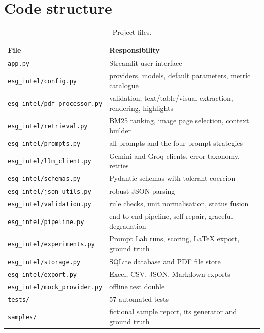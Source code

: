 \documentclass[11pt,a4paper]{article}
\newcommand{\code}[1]{\texttt{\small #1}}
\begin{document}
\section{Code structure}
\begin{table}[H]
\centering\small
\begin{tabular}{@{}ll@{}}
\toprule
\textbf{File} & \textbf{Responsibility}\\\midrule
\code{app.py} & Streamlit user interface\\
\code{esg\_intel/config.py} & providers, models, default parameters, metric catalogue\\
\code{esg\_intel/pdf\_processor.py} & validation, text/table/visual extraction, rendering, highlights\\
\code{esg\_intel/retrieval.py} & BM25 ranking, image page selection, context builder\\
\code{esg\_intel/prompts.py} & all prompts and the four prompt strategies\\
\code{esg\_intel/llm\_client.py} & Gemini and Groq clients, error taxonomy, retries\\
\code{esg\_intel/schemas.py} & Pydantic schemas with tolerant coercion\\
\code{esg\_intel/json\_utils.py} & robust JSON parsing\\
\code{esg\_intel/validation.py} & rule checks, unit normalisation, status fusion\\
\code{esg\_intel/pipeline.py} & end-to-end pipeline, self-repair, graceful degradation\\
\code{esg\_intel/experiments.py} & Prompt Lab runs, scoring, LaTeX export, ground truth\\
\code{esg\_intel/storage.py} & SQLite database and PDF file store\\
\code{esg\_intel/export.py} & Excel, CSV, JSON, Markdown exports\\
\code{esg\_intel/mock\_provider.py} & offline test double\\
\code{tests/} & 57 automated tests\\
\code{samples/} & fictional sample report, its generator and ground truth\\
\bottomrule
\end{tabular}
\caption{Project files.}
\end{table}
\end{document}
